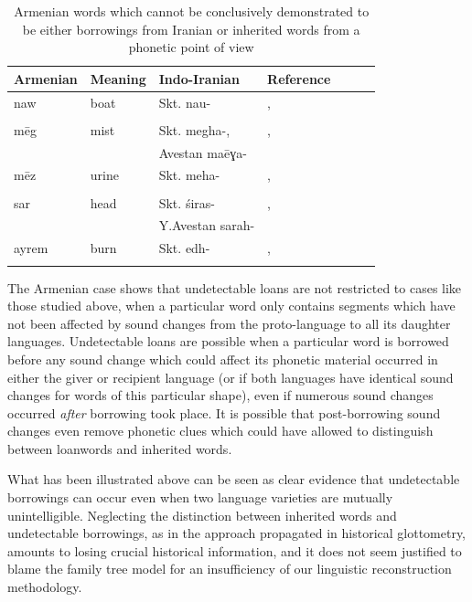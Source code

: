 \documentclass[svgnames,12pt]{scrartcl}
\newcommand{\ipa}[1]{{{\phon\mbox{#1}}}}
\begin{document}
{{\begin{table}[h]
\caption{Armenian words which cannot be conclusively demonstrated to be either borrowings from Iranian or inherited words from a phonetic point of view    } \centering \label{tab:armenian}
\begin{tabular}{lllllll}
\toprule 
Armenian & Meaning & Indo-Iranian & Reference \\
\midrule 
\ipa{naw}& boat & Skt. \ipa{nau-} & \citet[16-17;201]{huebschmann97armenische},\\
&&& \citet[466;715]{martirosyan10etymological} \\
\midrule 
\ipa{mēg}& mist & Skt. \ipa{megha-},  & \citet[474]{huebschmann97armenische},\\
&&Avestan \ipa{maēɣa-}& \citet[466;715]{martirosyan10etymological} \\
\midrule 
\ipa{mēz}& urine & Skt. \ipa{meha-} & \citet[474]{huebschmann97armenische},\\
&&& \citet[466;715]{martirosyan10etymological} \\
\midrule 
\ipa{sar}& head & Skt. \ipa{śiras-} & \citet[236;489]{huebschmann97armenische},\\
&&Y.Avestan \ipa{sarah-}& \citet[571]{martirosyan10etymological} \\
\midrule 
\ipa{ayrem}& burn & Skt. \ipa{edh-} & \citet[418]{huebschmann97armenische},\\
&&& \citet[145]{martzloff16geri} \\
\bottomrule
\end{tabular}
\end{table}
 
The Armenian case shows that undetectable loans are not restricted to cases like those studied above, when a particular word only contains segments which have not been affected by sound changes from the proto-language to all its daughter languages. Undetectable loans are possible when a particular word is borrowed before any sound change which could affect its phonetic material occurred in either the giver or recipient language (or if both languages have identical sound changes for words of this particular shape), even if numerous sound changes occurred \textit{after} borrowing took place. It is possible that post-borrowing sound changes even remove phonetic clues which could have allowed to distinguish between loanwords and inherited words.

What has been illustrated above can be seen as clear evidence that undetectable borrowings can occur even when two language varieties are mutually unintelligible. Neglecting the distinction between inherited words and undetectable borrowings, as in the approach propagated in historical glottometry, amounts to losing crucial historical information, and it does not seem justified to blame the family tree model for an insufficiency of our linguistic reconstruction methodology.

}}
\end{document}

